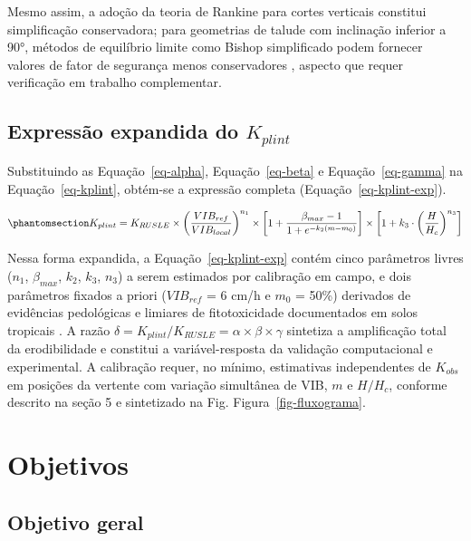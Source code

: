 \documentclass[
  brazilian,
  authoryear,
  preprint]{elsarticle}
\begin{document}
Mesmo assim, a adoção da teoria de Rankine para cortes verticais
constitui simplificação conservadora; para geometrias de talude com
inclinação inferior a 90°, métodos de equilíbrio limite como Bishop
simplificado podem fornecer valores de fator de segurança menos
conservadores \citep{fredlund_rahardjo_1993}, aspecto que requer
verificação em trabalho complementar.

\subsection{\texorpdfstring{Expressão expandida do
\(K_{plint}\)}{Expressão expandida do K\_\{plint\}}}\label{expressuxe3o-expandida-do-k_plint}

Substituindo as Equação~\ref{eq-alpha}, Equação~\ref{eq-beta} e
Equação~\ref{eq-gamma} na Equação~\ref{eq-kplint}, obtém-se a expressão
completa (Equação~\ref{eq-kplint-exp}).

\begin{equation}\phantomsection\label{eq-kplint-exp}{
K_{plint} = K_{RUSLE} \times \left(\dfrac{VIB_{ref}}{VIB_{local}}\right)^{n_1} \times \left[1 + \dfrac{\beta_{max} - 1}{1 + e^{-k_2(m - m_0)}}\right] \times \left[1 + k_3 \cdot \left(\dfrac{H}{H_c}\right)^{n_3}\right]
}\end{equation}

Nessa forma expandida, a Equação~\ref{eq-kplint-exp} contém cinco
parâmetros livres (\(n_1\), \(\beta_{max}\), \(k_2\), \(k_3\), \(n_3\))
a serem estimados por calibração em campo, e dois parâmetros fixados a
priori (\(VIB_{ref}\) = 6 cm/h e \(m_0\) = 50\%) derivados de evidências
pedológicas e limiares de fitotoxicidade documentados em solos tropicais
\citep{embrapa_2018}. A razão
\(\delta = K_{plint}/K_{RUSLE} = \alpha \times \beta \times \gamma\)
sintetiza a amplificação total da erodibilidade e constitui a
variável-resposta da validação computacional e experimental. A
calibração requer, no mínimo, estimativas independentes de \(K_{obs}\)
em posições da vertente com variação simultânea de VIB, \(m\) e
\(H/H_c\), conforme descrito na seção 5 e sintetizado na Fig.
Figura~\ref{fig-fluxograma}.

\section{Objetivos}\label{objetivos}

\subsection{Objetivo geral}\label{objetivo-geral}
\end{document}
